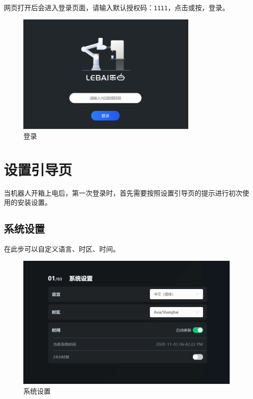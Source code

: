 网页打开后会进入登录页面，请输入默认授权码：\verb|1111|，点击或按，登录\LM。

\begin{figure}[ht]
    \centering
    \includegraphics[width=0.8\textwidth]{screen/2-4.png}
    \caption{登录\LM}
    \label{fig:登录LM}
\end{figure}

\clearpage

\section{设置引导页}

当机器人开箱上电后，第一次登录\LM 时，首先需要按照设置引导页的提示进行初次使用的安装设置。
\subsection{系统设置}
在此步可以自定义语言、时区、时间。

\begin{figure}[ht]
    \centering
    \includegraphics[width=\textwidth]{screen/2-5.png}
    \caption{系统设置}
    \label{fig:系统设置}
\end{figure}

